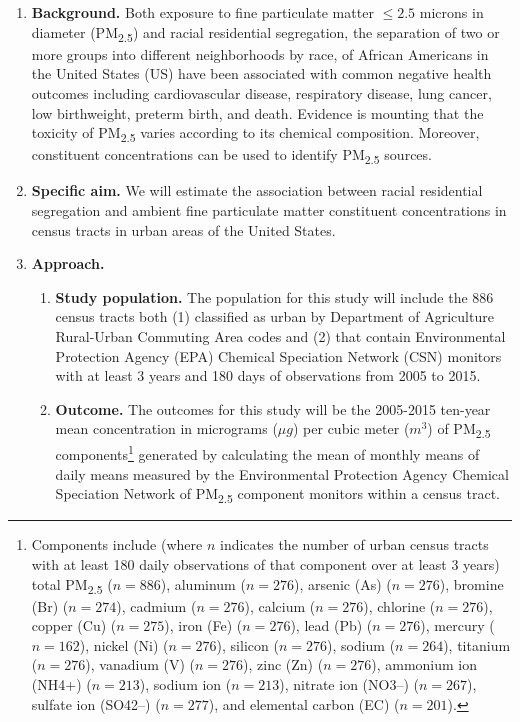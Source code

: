 \documentclass{article}\usepackage[]{graphicx}\usepackage[]{color}
\title{\vspace{-1cm}}
\author{\textbf{Midterm Examination} \\ \textbf{Katherine Wolf} \\ PH250C Spring 2020 \\ March 31, 2020}
\date{}
\begin{document}
\maketitle

\vspace{-.5cm}

\begin{enumerate}[label=\textbf{\arabic*.}]

  \item \textbf{Background.} Both exposure to fine particulate matter $\leq 2.5$ microns in diameter (PM\textsubscript{2.5}) and racial residential segregation, the separation of two or more groups into different neighborhoods by race, of African Americans in the United States (US) have been associated with common negative health outcomes including cardiovascular disease, respiratory disease, lung cancer, low birthweight, preterm birth, and death. Evidence is mounting that the toxicity of PM\textsubscript{2.5} varies according to its chemical composition. Moreover, constituent concentrations can be used to identify PM\textsubscript{2.5} sources.
  
  \item \textbf{Specific aim.} We will estimate the association between racial residential segregation and ambient fine particulate matter constituent concentrations in census tracts in urban areas of the United States.
  \item \textbf{Approach.}
  
  \begin{enumerate}[label=\textbf{\alph*.}]
    
    \item \textbf{Study population.} The population for this study will include the 886 census tracts both (1) classified as urban by Department of Agriculture Rural-Urban Commuting Area codes and (2) that contain Environmental Protection Agency (EPA) Chemical Speciation Network (CSN) monitors with at least 3 years and 180 days of observations from 2005 to 2015.
    
    \item \textbf{Outcome.} The outcomes for this study will be the 2005-2015 ten-year mean concentration in micrograms ($\mu g$) per cubic meter ($m^3$) of PM\textsubscript{2.5} components\footnote{Components include (where $n$ indicates the number of urban census tracts with at least 180 daily observations of that component over at least 3 years) total PM\textsubscript{2.5} ($n=886$), aluminum ($n=276$), arsenic (As) ($n=276$), bromine (Br) ($n=274$), cadmium ($n=276$), calcium ($n=276$), chlorine ($n=276$), copper (Cu) ($n=275$), iron (Fe) ($n=276$), lead (Pb) ($n=276$), mercury ($n=162$), nickel (Ni) ($n=276$), silicon ($n=276$), sodium ($n=264$), titanium ($n=276$), vanadium (V) ($n=276$), zinc (Zn) ($n=276$), ammonium ion (NH4+) ($n=213$), sodium ion ($n=213$), nitrate ion (NO3–) ($n=267$), sulfate ion (SO42–) ($n=277$), and elemental carbon (EC) ($n=201$).} generated by calculating the mean of monthly means of daily means measured by the Environmental Protection Agency Chemical Speciation Network of PM\textsubscript{2.5} component monitors within a census tract.
    

\end{enumerate}
\end{enumerate}
\end{document}
